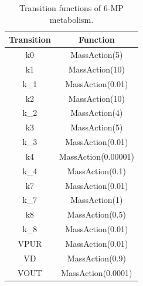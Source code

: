 \documentclass[journal,a4paper,onecolumn]{article}
\begin{document}
\begin{table}[!hbt]
	\begin{center}
		\caption{Transition functions of 6-MP metabolism.}
		\label{Transition functions of 6-MP metabolism}
		\begin{tabular}{|c|c|}
			\hline
			Transition&Function\\
			\hline
			k0&MassAction(5)\\
			\hline
			k1&MassAction(10)\\
			\hline
			k\_1&MassAction(0.01)\\
			\hline
			k2&MassAction(10)\\
			\hline
			k\_2&MassAction(4)\\
			\hline
			k3&MassAction(5)\\
			\hline
			k\_3&MassAction(0.01)\\
			\hline
			k4&MassAction(0.00001)\\
			\hline
			k\_4&MassAction(0.1)\\
			\hline
			k7&MassAction(0.01)\\
			\hline
			k\_7&MassAction(1)\\
			\hline
			k8&MassAction(0.5)\\
			\hline
			k\_8&MassAction(0.01)\\
			\hline
			VPUR&MassAction(0.01)\\
			\hline
			VD&MassAction(0.9)\\
			\hline
			VOUT&MassAction(0.0001)\\
			\hline
		\end{tabular}
	\end{center}
\end{table}
\end{document}
